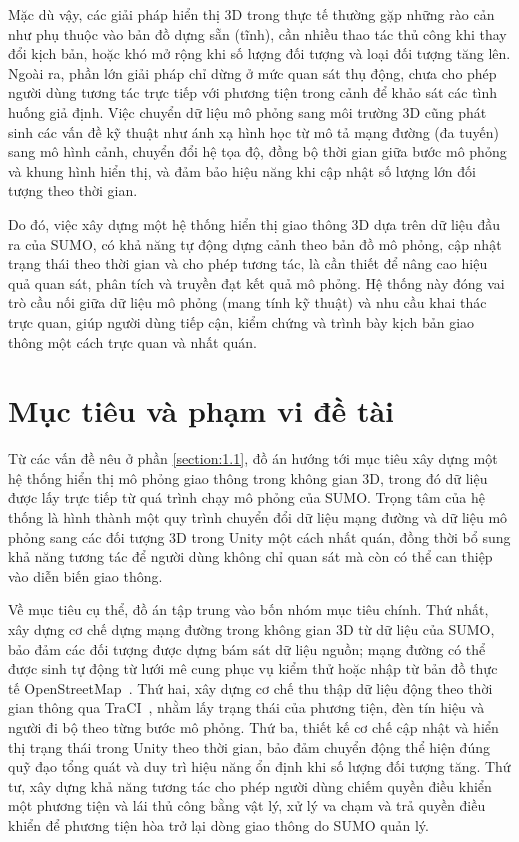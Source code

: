 \documentclass[../DoAn.tex]{subfiles}
\begin{document}
Mặc dù vậy, các giải pháp hiển thị 3D trong thực tế thường gặp những rào cản như
phụ thuộc vào bản đồ dựng sẵn (tĩnh), cần nhiều thao tác thủ công khi thay đổi
kịch bản, hoặc khó mở rộng khi số lượng đối tượng và loại đối tượng tăng lên.
Ngoài ra, phần lớn giải pháp chỉ dừng ở mức quan sát thụ động, chưa cho phép
người dùng tương tác trực tiếp với phương tiện trong cảnh để khảo sát các tình
huống giả định. Việc chuyển dữ liệu mô phỏng sang môi trường 3D cũng phát sinh
các vấn đề kỹ thuật như ánh xạ hình học từ mô tả mạng đường (đa tuyến) sang mô
hình cảnh, chuyển đổi hệ tọa độ, đồng bộ thời gian giữa bước mô phỏng và khung
hình hiển thị, và đảm bảo hiệu năng khi cập nhật số lượng lớn đối tượng theo
thời gian.

Do đó, việc xây dựng một hệ thống hiển thị giao thông 3D dựa trên dữ liệu đầu ra
của \gls{SUMO}, có khả năng tự động dựng cảnh theo bản đồ mô phỏng, cập nhật
trạng thái theo thời gian và cho phép tương tác, là cần thiết để nâng cao hiệu
quả quan sát, phân tích và truyền đạt kết quả mô phỏng. Hệ thống này đóng vai
trò cầu nối giữa dữ liệu mô phỏng (mang tính kỹ thuật) và nhu cầu khai thác trực
quan, giúp người dùng tiếp cận, kiểm chứng và trình bày kịch bản giao thông một
cách trực quan và nhất quán.

\section{Mục tiêu và phạm vi đề tài}
\label{section:1.2}

Từ các vấn đề nêu ở phần \ref{section:1.1}, đồ án hướng tới mục tiêu xây dựng một
hệ thống hiển thị mô phỏng giao thông trong không gian 3D, trong đó dữ liệu được
lấy trực tiếp từ quá trình chạy mô phỏng của \gls{SUMO}. Trọng tâm của hệ thống
là hình thành một quy trình chuyển đổi dữ liệu mạng đường và dữ liệu mô phỏng
sang các đối tượng 3D trong Unity một cách nhất quán, đồng thời bổ sung khả năng
tương tác để người dùng không chỉ quan sát mà còn có thể can thiệp vào diễn biến
giao thông.

Về mục tiêu cụ thể, đồ án tập trung vào bốn nhóm mục tiêu chính. Thứ nhất, xây
dựng cơ chế dựng mạng đường trong không gian 3D từ dữ liệu của \gls{SUMO}, bảo
đảm các đối tượng được dựng bám sát dữ liệu nguồn; mạng đường có thể được sinh
tự động từ lưới mê cung phục vụ kiểm thử hoặc nhập từ bản đồ thực tế
OpenStreetMap~\cite{osm}. Thứ hai, xây dựng cơ chế thu thập dữ liệu động theo thời gian
thông qua \gls{TraCI}~\cite{traci2008}, nhằm lấy trạng thái của phương tiện, đèn tín hiệu và
người đi bộ theo từng bước mô phỏng. Thứ ba, thiết kế cơ chế cập nhật và hiển
thị trạng thái trong Unity theo thời gian, bảo đảm chuyển động thể hiện đúng quỹ
đạo tổng quát và duy trì hiệu năng ổn định khi số lượng đối tượng tăng. Thứ tư,
xây dựng khả năng tương tác cho phép người dùng chiếm quyền điều khiển một
phương tiện và lái thủ công bằng vật lý, xử lý va chạm và trả quyền điều khiển
để phương tiện hòa trở lại dòng giao thông do \gls{SUMO} quản lý.
\end{document}
